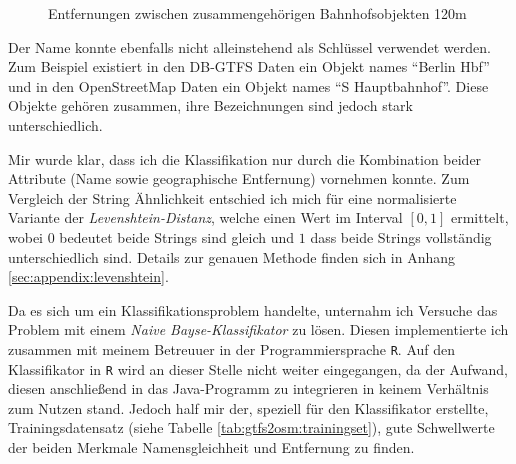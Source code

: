  \begin{figure}[htb]
   \centering
   \caption{Entfernungen zwischen zusammengehörigen Bahnhofsobjekten 120m}
   \label{fig:gtfs2osm:farLikelihood}
 \end{figure}
Der Name konnte ebenfalls nicht alleinstehend als Schlüssel verwendet werden. Zum Beispiel existiert in den DB-GTFS Daten ein Objekt names ``Berlin Hbf'' und in den OpenStreetMap Daten ein Objekt names ``S Hauptbahnhof''. Diese Objekte gehören zusammen, ihre Bezeichnungen sind jedoch stark unterschiedlich.

Mir wurde klar, dass ich die Klassifikation nur durch die Kombination beider Attribute (Name sowie geographische Entfernung) vornehmen konnte. Zum Vergleich der String Ähnlichkeit entschied ich mich für eine normalisierte Variante der \textit{Levenshtein-Distanz}, welche einen Wert im Interval $[0,1]$ ermittelt, wobei $0$ bedeutet beide Strings sind gleich und $1$ dass beide Strings vollständig unterschiedlich sind. Details zur genauen Methode finden sich in Anhang \ref{sec:appendix:levenshtein}.

Da es sich um ein Klassifikationsproblem handelte, unternahm ich Versuche das Problem mit einem \textit{Naive Bayse-Klassifikator} zu lösen.
Diesen implementierte ich zusammen mit meinem Betreuuer in der Programmiersprache \texttt{R}.
Auf den Klassifikator in \texttt{R} wird an dieser Stelle nicht weiter eingegangen, da der Aufwand, diesen anschließend in das Java-Programm zu integrieren in keinem Verhältnis zum Nutzen stand.
Jedoch half mir der, speziell für den Klassifikator erstellte, Trainingsdatensatz (siehe Tabelle \ref{tab:gtfs2osm:trainingset}), gute Schwellwerte der beiden Merkmale Namensgleichheit und Entfernung zu finden.

